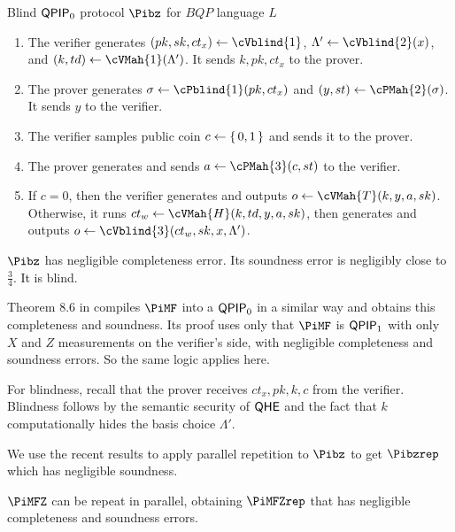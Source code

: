 \begin{protocol}{Blind $\operatorname{\mathsf{QPIP}}_0$ protocol $\Pibz$ for $BQP$ language $L$}
	\label{proto:QPIP0BQP}
	\begin{enumerate}
		\item The verifier generates $(pk, sk, ct_x)\leftarrow\cVblind{1}$,
			$\Lambda'\leftarrow\cVblind{2}(x)$,
			and $(k, td)\leftarrow\cVMah{1}(\Lambda')$.
			It sends $k, pk, ct_x$ to the prover.
		\item The prover generates $\sigma\leftarrow\cPblind{1}(pk, ct_x)$ and
			$(y, st)\leftarrow\cPMah{2}(\sigma)$.
			It sends $y$ to the verifier.
		\item The verifier samples public coin $c\leftarrow\set{0, 1}$ and sends it to the prover.
		\item The prover generates and sends $a\leftarrow\cPMah{3}(c, st)$ to the verifier.
		\item If $c=0$, then the verifier generates and outputs $o\leftarrow\cVMah{T}(k, y, a, sk)$.
			Otherwise, it runs $ct_w\leftarrow\cVMah{H}(k, td, y, a, sk)$,
			then generates and outputs $o\leftarrow\cVblind{3}(ct_w, sk, x, \Lambda')$.
	\end{enumerate}
\end{protocol}

\begin{thm}
	$\Pibz$ has negligible completeness error. Its soundness error is negligibly close to $\frac{3}{4}$. It is blind.
\end{thm}
\begin{prf}
	Theorem $8.6$ in \cite{FOCS:Mahadev18a} compiles $\PiMF$ into a $\operatorname{\mathsf{QPIP}}_0$ in a similar way and obtains this completeness and soundness.
	Its proof uses only that $\PiMF$ is $\operatorname{\mathsf{QPIP}}_1$ with only $X$ and $Z$ measurements on the verifier's side, with negligible completeness and soundness errors.
	So the same logic applies here.

	For blindness, recall that the prover receives $ct_x, pk, k, c$ from the verifier.
	Blindness follows by the semantic security of $\mathsf{QHE}$ and the fact that $k$ computationally hides the basis choice $\Lambda'$.
\end{prf}

We use the recent results \cite{parallelrep, alagic2019twomessage} to apply parallel repetition to $\Pibz$ to get $\Pibzrep$ which has negligible soundness.

\begin{thm}
	\label{thm:MFZrep}
	$\PiMFZ$ can be repeat in parallel, obtaining $\PiMFZrep$ that has negligible completeness and soundness errors.
\end{thm}

